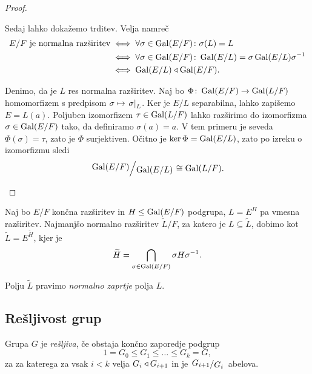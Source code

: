 \begin{proof}
\begin{enumerate}[i)]
Sedaj lahko dokažemo trditev. Velja namreč
\begin{align*}
\text{$E/F$ je normalna razširitev} &\iff
\forall \sigma \in \operatorname{Gal}(E/F) \colon \sigma(L) = L
\\
&\iff
\forall \sigma \in \operatorname{Gal}(E/F) \colon
\operatorname{Gal}(E/L) = \sigma \operatorname{Gal}(E/L) \sigma^{-1}
\\
&\iff
\operatorname{Gal}(E/L) \triangleleft \operatorname{Gal}(E/F).
\end{align*}

Denimo, da je $L$ res normalna razširitev. Naj bo
$\Phi \colon \operatorname{Gal}(E/F) \to \operatorname{Gal}(L/F)$ homomorfizem s predpisom
$\sigma \mapsto \left. \sigma\right|_{L}^{}$. Ker je $E/L$ separabilna,
lahko zapišemo $E = L(a)$. Poljuben izomorfizem
$\tau \in \operatorname{Gal}(L/F)$ lahko razširimo do izomorfizma
$\sigma \in \operatorname{Gal}(E/F)$ tako, da definiramo $\sigma(a) = a$. V tem
primeru je seveda $\Phi(\sigma) = \tau$, zato je $\Phi$
surjektiven. Očitno je $\ker \Phi = \operatorname{Gal}(E/L)$, zato po izreku o
izomorfizmu sledi
\[
\kvoc{\Gal(E/F)}{\Gal(E/L)} \cong \Gal(L/F). \qedhere
\]
\end{enumerate}
\end{proof}


\begin{opomba}
Naj bo $E/F$ končna razširitev in $H \leq \operatorname{Gal}(E/F)$ podgrupa,
$L = E^H$ pa vmesna razširitev. Najmanjšo normalno razširitev
$\widetilde{L}/F$, za katero je $L \subseteq \widetilde{L}$, dobimo
kot $\widetilde{L} = E^{\widetilde{H}}$, kjer je
\[
\widetilde{H} =
\bigcap_{\sigma \in \operatorname{Gal}(E/F)} \sigma H \sigma^{-1}.
\]
\end{opomba}

\begin{definicija}
Polju $\widetilde{L}$ pravimo
\emph{normalno zaprtje} polja $L$.
\end{definicija}

\newpage

\subsection{Rešljivost grup}

\begin{definicija}
Grupa $G$ je \emph{rešljiva}, če obstaja
končno zaporedje podgrup
\[
1 = G_0 \leq G_1 \leq \dots \leq G_k = G,
\]
za za katerega za vsak $i < k$ velja $G_i \triangleleft G_{i+1}$ in je
$\kvoc{G_{i+1}}{G_i}$ abelova.
\end{definicija}


